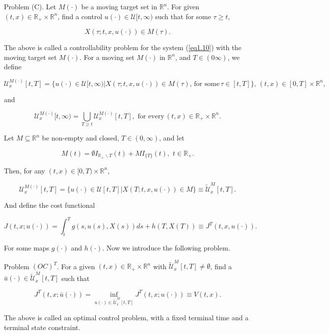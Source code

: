 Problem (C). Let $M(\cdot)$ be a moving target set in $\mathbb{R}^n$. For given $(t,x)\in \mathbb{R}_{+}\times \mathbb{R}^n$, find a control $u(\cdot)\in \mathcal{U}[t,\infty)$ such that for some $\tau \geq t$,

$$X(\tau;t,x,u(\cdot))\in M(\tau).$$

The above is called a controllability problem for the system (\ref{eq1.10}) with the moving target set $M(\cdot)$. For a moving set $M(\cdot)$ in $\mathbb{R}^n$, and $T\in (0\infty)$, we define

$$\mathcal{U}^{M(\cdot)}_x[t,T]=\{u(\cdot)\in \mathcal{U}[t,\infty) | X(\tau;t,x,u(\cdot))\in M(\tau),\,\mbox{for some}\, \tau\in[t,T]\},\, (t,x)\in [0,T]\times \mathbb{R}^n,$$

and

$$\mathcal{U}^{M(\cdot)}_x[t,\infty)=\bigcup_{T\geq t}\mathcal{U}^{M(\cdot)}_x[t,T],\,\,\mbox{for every}\, (t,x)\in\mathbb{R}_{+}\times\mathbb{R}^n.$$

Let $M\subseteq \mathbb{R}^n$ be non-empty and closed, $T\in(0,\infty)$, and let

$$M(t)=\emptyset I_{\mathbb{R}_{+}\backslash{T}}(t)+MI_{\{T\}}(t),\,\, t\in \mathbb{R}_{+}.$$

Then, for any $(t,x)\in [0,T)\times \mathbb{R}^n$,

$$\mathcal{U}^{M(\cdot)}_x[t,T]=\{u(\cdot)\in \mathcal{U}[t,T] | X(T;t,x,u(\cdot))\in M \}\equiv \tilde{\mathcal{U}}^M_x [t,T].$$

And define the cost functional

$$J(t,x;u(\cdot))=\int_{t}^{T}g(s,u(s),X(s))ds+h(T,X(T))\equiv J^T(t,x,u(\cdot)).$$

For some maps $g(\cdot)$ and $h(\cdot)$. Now we introduce the following problem.

Problem $(OC)^T$. For a given $(t,x)\in \mathbb{R}_{+}\times \mathbb{R}^n$ with $\tilde{\mathcal{U}}^M_x[t,T]\neq\emptyset$, find a $\bar{u}(\cdot)\in \tilde{\mathcal{U}}^M_x[t,T]$ such that

\begin{equation*}
J^T(t,x;\bar{u}(\cdot))=\inf_{u(\cdot)\in \tilde{\mathcal{U}}^M_x[t,T]} J^T(t,x;u(\cdot))\equiv V(t,x).
\end{equation*}

The above is called an optimal control problem, with a fixed terminal time and a terminal state constraint.
